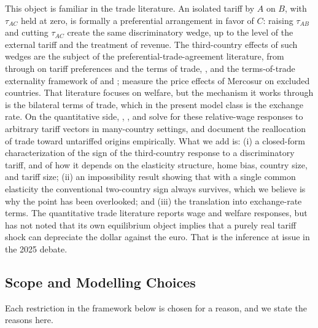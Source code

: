 \documentclass[11pt]{article}
\theoremstyle{plain}
\theoremstyle{remark}
\numberwithin{lemma}{section}
\numberwithin{proposition}{section}
\numberwithin{corollary}{section}
\newenvironment{revblock}{\par\begingroup\color{RevBlue}}{\endgroup\par}
\begin{document}
\begin{revblock}
This object is familiar in the trade literature. An isolated tariff by $A$ on $B$, with $\tau_{AC}$ held at zero, is formally a preferential arrangement in favor of $C$: raising $\tau_{AB}$ and cutting $\tau_{AC}$ create the same discriminatory wedge, up to the level of the external tariff and the treatment of revenue. The third-country effects of such wedges are the subject of the preferential-trade-agreement literature, from \cite{viner1950} through \cite{mundell1964} on tariff preferences and the terms of trade, \cite{kempwan1976}, and the terms-of-trade externality framework of \cite{bagwell1999} and \cite{bagwell2002}; \cite{changwinters2002} measure the price effects of Mercosur on excluded countries. That literature focuses on welfare, but the mechanism it works through is the bilateral terms of trade, which in the present model class is the exchange rate. On the quantitative side, \cite{caliendo2015}, \cite{ossa2014}, and \cite{costinot2014} solve for these relative-wage responses to arbitrary tariff vectors in many-country settings, and \cite{fajgelbaum2024trade} document the reallocation of trade toward untariffed origins empirically. What we add is: (i) a closed-form characterization of the sign of the third-country response to a discriminatory tariff, and of how it depends on the elasticity structure, home bias, country size, and tariff size; (ii) an impossibility result showing that with a single common elasticity the conventional two-country sign always survives, which we believe is why the point has been overlooked; and (iii) the translation into exchange-rate terms. The quantitative trade literature reports wage and welfare responses, but has not noted that its own equilibrium object implies that a purely real tariff shock can depreciate the dollar against the euro. That is the inference at issue in the 2025 debate.

\subsection{Scope and Modelling Choices}
\label{sec:scope}

Each restriction in the framework below is chosen for a reason, and we state the reasons here.


\end{revblock}
\end{document}
